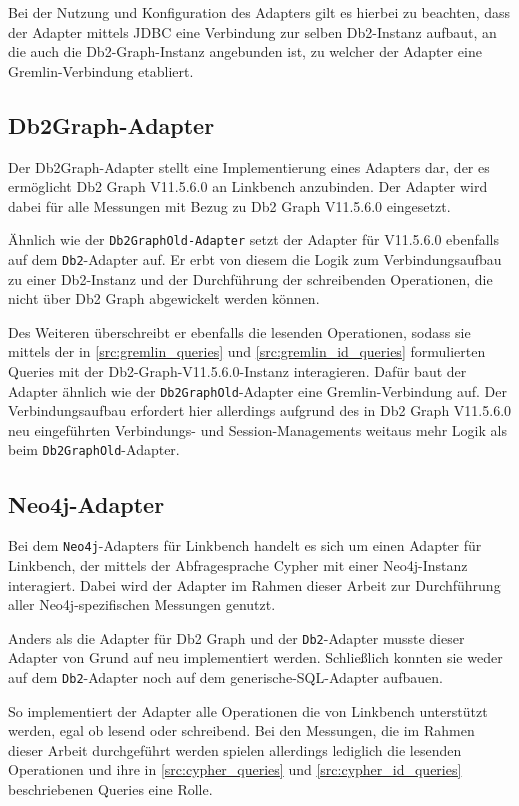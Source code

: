 Bei der Nutzung und Konfiguration des Adapters gilt es hierbei zu beachten, dass der Adapter mittels JDBC eine Verbindung zur selben Db2-Instanz aufbaut, an die auch die Db2-Graph-Instanz angebunden ist, zu welcher der Adapter  eine Gremlin-Verbindung etabliert.


\subsection{Db2Graph-Adapter}
Der Db2Graph-Adapter stellt eine Implementierung eines Adapters dar, der es ermöglicht Db2 Graph V11.5.6.0 an Linkbench anzubinden. Der Adapter wird dabei für alle Messungen mit Bezug zu Db2 Graph V11.5.6.0 eingesetzt. 

Ähnlich wie der \texttt{Db2GraphOld-Adapter} setzt der Adapter für V11.5.6.0 ebenfalls auf dem \texttt{Db2}-Adapter auf. Er erbt von diesem die Logik zum Verbindungsaufbau zu einer Db2-Instanz und der Durchführung der schreibenden Operationen, die nicht über Db2 Graph abgewickelt werden können. 

Des Weiteren überschreibt er ebenfalls die lesenden Operationen, sodass sie mittels der in \autoref{src:gremlin_queries} und \autoref{src:gremlin_id_queries} formulierten Queries mit der Db2-Graph-V11.5.6.0-Instanz interagieren. Dafür baut der Adapter ähnlich wie der \texttt{Db2GraphOld}-Adapter eine Gremlin-Verbindung auf. Der Verbindungsaufbau erfordert hier allerdings aufgrund des in Db2 Graph V11.5.6.0 neu eingeführten Verbindungs- und Session-Managements weitaus mehr Logik als beim \texttt{Db2GraphOld}-Adapter.

\subsection{Neo4j-Adapter}
Bei dem \texttt{Neo4j}-Adapters für Linkbench handelt es sich um einen Adapter für Linkbench, der mittels der Abfragesprache Cypher mit einer Neo4j-Instanz interagiert. Dabei wird der Adapter im Rahmen dieser Arbeit zur Durchführung aller Neo4j-spezifischen Messungen genutzt. 

Anders als die Adapter für Db2 Graph und der \texttt{Db2}-Adapter musste dieser Adapter von Grund auf neu implementiert werden. Schließlich konnten sie weder auf dem \texttt{Db2}-Adapter noch auf dem generische-SQL-Adapter aufbauen. 

So implementiert der Adapter alle Operationen die von Linkbench unterstützt werden, egal ob lesend oder schreibend. Bei den Messungen, die im Rahmen dieser Arbeit durchgeführt werden spielen allerdings lediglich die lesenden Operationen und ihre in \autoref{src:cypher_queries} und \autoref{src:cypher_id_queries} beschriebenen Queries eine Rolle.

